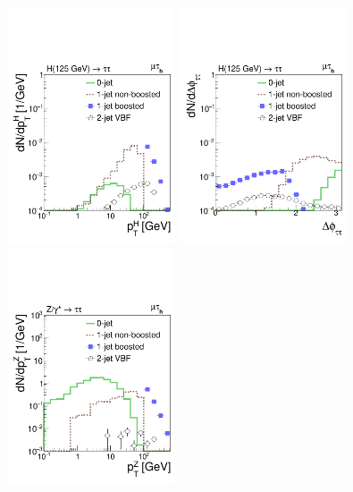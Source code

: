 %
%
\begin{figure}
\setlength{\unitlength}{1mm}
\begin{center}
\includegraphics*[height=70mm]{plots_sept_16/Higgs_pT_muhad.pdf}
\includegraphics*[height=70mm]{plots_sept_16/Higgs_dPhiTauTau_muhad.pdf}\\
\includegraphics*[height=70mm]{plots_sept_16/DYJets_pT_muhad.pdf}

\end{center}
\end{figure}
